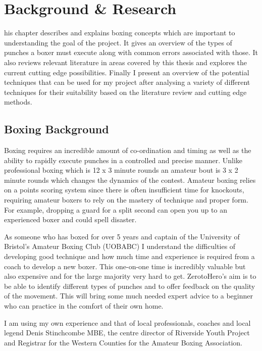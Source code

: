 %
%
\let\textcircled=\pgftextcircled
\chapter{Background \& Research}
\label{chap:intro}

his chapter describes and explains boxing concepts which are important to understanding the goal of the project. It gives an overview of the types of punches a boxer must execute along with common errors associated with those. It also reviews relevant literature in areas covered by this thesis and explores the current cutting edge possibilities. Finally I present an overview of the potential techniques that can be used for my project after analysing a variety of different techniques for their suitability based on the literature review and cutting edge methods.

\section{Boxing Background}
\label{sec:sec01}
Boxing requires an incredible amount of co-ordination and timing as well as the ability to rapidly execute punches in a controlled and precise manner. Unlike professional boxing which is 12 x 3 minute rounds an amateur bout is 3 x 2 minute rounds which changes the dynamics of the contest. Amateur boxing relies on a points scoring system since there is often insufficient time for knockouts, requiring amateur boxers to rely on the mastery of technique and proper form. For example, dropping a guard for a split second can open you up to an experienced boxer and could spell disaster.

As someone who has boxed for over 5 years and captain of the University of Bristol's Amateur Boxing Club (UOBABC) I understand the difficulties of developing good technique and how much time and experience is required from a coach to develop a new boxer. This one-on-one time is incredibly valuable but also expensive and for the large majority very hard to get. ZerotoHero's aim is to be able to identify different types of punches and to offer feedback on the quality of the movement. This will bring some much needed expert advice to a beginner who can practice in the comfort of their own home.

I am using my own experience and that of local professionals, coaches and local legend Denis Stinchcombe MBE, the centre director of Riverside Youth Project and Registrar for the Western Counties for the Amateur Boxing Association.
 

